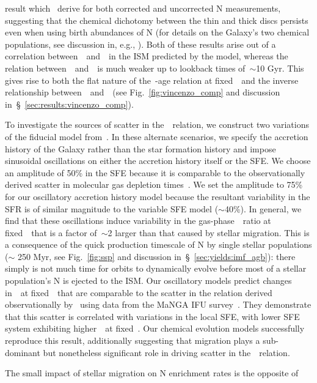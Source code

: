 \documentclass[ms.tex]{subfiles}
\begin{document}
result which~\citet{Vincenzo2021} derive for both corrected and uncorrected
N measurements, suggesting that the chemical dichotomy between the thin and
thick discs persists even when using birth abundances of N (for details on
the Galaxy's two chemical populations, see discussion in, e.g.,
\citealp{Hayden2015, Weinberg2019, Weinberg2021, Griffith2021b}).
Both of these results arise out of a correlation between~\nh~and~\feh~in the
ISM predicted by the model, whereas the relation between~\nh~and~\oh~is much
weaker up to lookback times of~$\sim$10 Gyr.
This gives rise to both the flat nature of the~\no-age relation at
fixed~\feh~and the inverse relationship between~\no~and~\ofe~(see
Fig.~\ref{fig:vincenzo_comp} and discussion
in~\S~\ref{sec:results:vincenzo_comp}).
\par
To investigate the sources of scatter in the~\ohno~relation, we construct two
variations of the fiducial model from~\citet{Johnson2021}.
In these alternate scenarios, we specify the accretion history of the
Galaxy rather than the star formation history and impose sinusoidal oscillations
on either the accretion history itself or the SFE.
We choose an amplitude of 50\% in the SFE because it is comparable to the
observationally derived scatter in molecular gas depletion
times~\citep{Tacconi2018}.
We set the amplitude to 75\% for our oscillatory accretion history model because
the resultant variability in the SFR is of similar magnitude to the variable
SFE model ($\sim$40\%).
In general, we find that these oscillations induce variability in the
gas-phase~\no~ratio at fixed~\oh~that is a factor of~$\sim$2 larger than that
caused by stellar migration.
This is a consequence of the quick production timescale of N by single stellar
populations ($\sim$ 250 Myr, see Fig.~\ref{fig:ssp} and discussion
in~\S~\ref{sec:yields:imf_agb}): there simply is not much time for orbits to
dynamically evolve before most of a stellar population's N is ejected to the
ISM.
Our oscillatory models predict changes in~\no~at fixed~\oh~that are comparable
to the scatter in the relation derived observationally by~\citet{Schaefer2020}
using data from the MaNGA IFU survey~\citep{Bundy2015}.
They demonstrate that this scatter is correlated with variations in the local
SFE, with lower SFE system exhibiting higher~\no~at fixed~\oh.
Our chemical evolution models successfully reproduce this result, additionally
suggesting that migration plays a sub-dominant but nonetheless significant
role in driving scatter in the~\ohno~relation.
\par
The small impact of stellar migration on N enrichment rates is the opposite of
\end{document}
